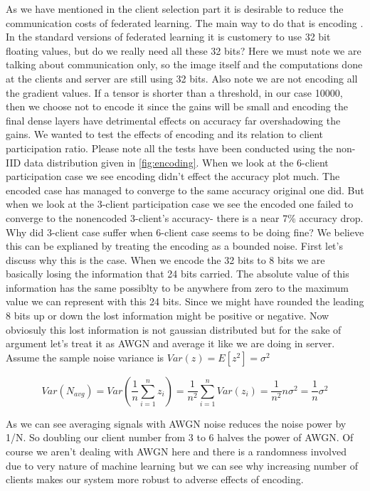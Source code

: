 \documentclass[11pt]{article}
\begin{document}
\par As we have mentioned in the client selection part it is desirable to reduce the communication costs of federated learning. The main way to do that is encoding \cite{compression1}\cite{compression2}. In the standard versions of federated learning it is customery to use 32 bit floating values, but do we really need all these 32 bits? Here we must note we are talking about communication only, so the image itself and the computations done at the clients and server are still using 32 bits. Also note we are not encoding all the gradient values. If a tensor is shorter than a threshold, in our case 10000, then we choose not to encode it since the gains will be small and encoding the final dense layers have detrimental effects on accuracy far overshadowing the gains\cite{compression2}. We wanted to test the effects of encoding and its relation to client participation ratio. Please note all the tests have been conducted using the non-IID data distribution given in \ref{fig:encoding}. When we look at the 6-client participation case we see encoding didn’t effect the accuracy plot much. The encoded case has managed to converge to the same accuracy original one did. But when we look at the 3-client participation case we see the encoded one failed to converge to the nonencoded 3-client’s accuracy- there is a near 7\% accuracy drop. Why did 3-client case suffer when 6-client case seems to be doing fine? We believe this can be explianed by treating the encoding as a bounded noise. First let’s discuss why this is the case. When we encode the 32 bits to 8 bits we are basically losing the information that 24 bits carried. The absolute value of this information has the same possiblty to be anywhere from zero to the maximum value we can represent with this 24 bits. Since we might have rounded the leading 8 bits up or down the lost information might be positive or negative. Now obviosuly this lost information is not gaussian distributed but for the sake of argument let’s treat it as AWGN and average it like we are doing in server. Assume the sample noise variance is $Var(z) = E[z^2] = \sigma^2$

\begin{equation}
Var(N_{avg}) = Var(\frac{1}{n}\sum_{i=1}^n z_i) = \frac{1}{n^2}
\sum_{i=1}^n Var(z_i) = \frac{1}{n^2}n\sigma^2 
	= \frac{1}{n}\sigma^2
\end{equation}

\par As we can see averaging signals with AWGN noise reduces the noise power by 1/N. So doubling our client number from 3 to 6 halves the power of AWGN. Of course we aren’t dealing with AWGN here and there is a randomness involved due to very nature of machine learning but we can see why increasing number of clients makes our system more robust to adverse effects of encoding. 
\end{document}
